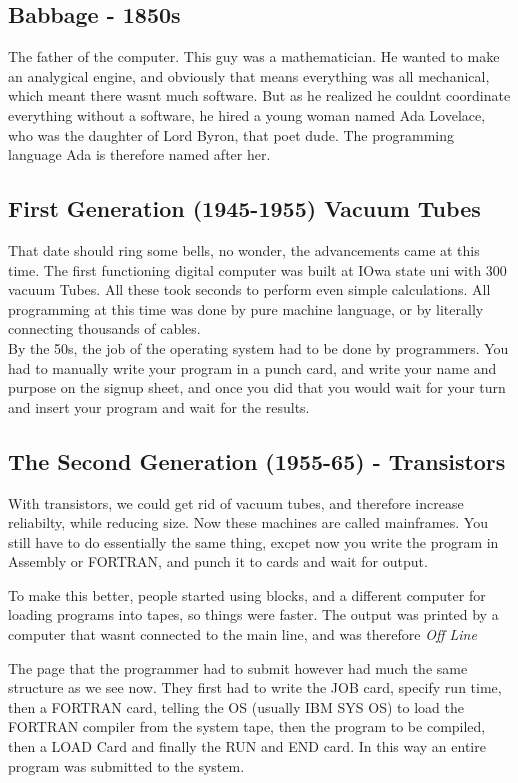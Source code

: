 \documentclass[11pt]{article}
\begin{document}
\subsection{Babbage - 1850s}
The father of the computer. This guy was a mathematician. He wanted to make an analygical engine, and obviously that means everything was all mechanical, which meant there wasnt much software. But as he realized he couldnt coordinate everything without a software, he hired a young woman named Ada Lovelace, who was the daughter of Lord Byron, that poet dude. The programming language Ada is therefore named after her. 

\subsection{First Generation (1945-1955) Vacuum Tubes}
That date should ring some bells, no wonder, the advancements came at this time. The first functioning digital computer was built at IOwa state uni with 300 vacuum Tubes. All these took seconds to perform even simple calculations. All programming at this time was done by pure machine language, or by literally connecting thousands of cables. \\
By the 50s, the job of the operating system had to be done by programmers. You had to manually write your program in a punch card, and write your name and purpose on the signup sheet, and once you did that you would wait for your turn and insert your program and wait for the results. 

\subsection{The Second Generation (1955-65) - Transistors}
With transistors, we could get rid of vacuum tubes, and therefore increase reliabilty, while reducing size. Now these machines are called mainframes. You still have to do essentially the same thing, excpet now you write the program in Assembly or FORTRAN, and punch it to cards and wait for output. 

To make this better, people started using blocks, and a different computer for loading programs into tapes, so things were faster. The output was printed by a computer that wasnt connected to the main line, and was therefore \textit{Off Line}

The page that the programmer had to submit however had much the same structure as we see now. They first had to write the JOB card, specify run time, then a FORTRAN card, telling the OS (usually IBM SYS OS) to load the FORTRAN compiler from the system tape, then the program to be compiled, then a LOAD Card and finally the RUN and END card. In this way an entire program was submitted to the system. 
\end{document}
